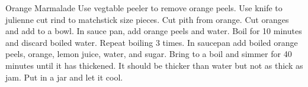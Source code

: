 \documentclass[../main.tex]{subfiles}
\begin{document}
\begin{recipe}{Orange Marmalade}{}{}
    Use vegtable peeler to remove orange peels. Use knife to julienne
    cut rind to matchstick size pieces. Cut pith from orange. Cut
    oranges and add to a bowl.
    In sauce pan, add orange peels and water. Boil for 10 minutes
    and discard boiled water. Repeat boiling 3 times. In saucepan
    add boiled orange peels, orange, lemon juice, water, and sugar.
    Bring to a boil and simmer for 40 minutes until it has thickened.
    It should be thicker than water but not as thick as jam. Put in a
    jar and let it cool.
\end{recipe}
\end{document}
